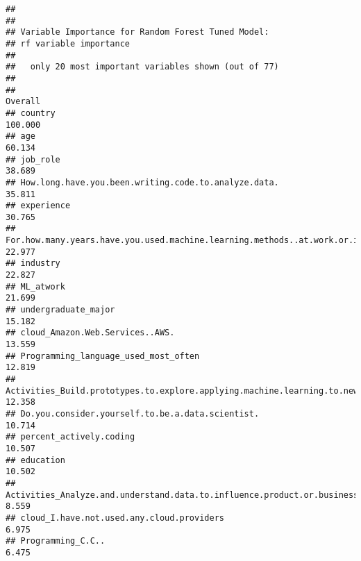 \documentclass[
]{article}
\begin{document}
\begin{verbatim}
## 
## 
## Variable Importance for Random Forest Tuned Model:
## rf variable importance
## 
##   only 20 most important variables shown (out of 77)
## 
##                                                                                                                             Overall
## country                                                                                                                     100.000
## age                                                                                                                          60.134
## job_role                                                                                                                     38.689
## How.long.have.you.been.writing.code.to.analyze.data.                                                                         35.811
## experience                                                                                                                   30.765
## For.how.many.years.have.you.used.machine.learning.methods..at.work.or.in.school..                                            22.977
## industry                                                                                                                     22.827
## ML_atwork                                                                                                                    21.699
## undergraduate_major                                                                                                          15.182
## cloud_Amazon.Web.Services..AWS.                                                                                              13.559
## Programming_language_used_most_often                                                                                         12.819
## Activities_Build.prototypes.to.explore.applying.machine.learning.to.new.areas                                                12.358
## Do.you.consider.yourself.to.be.a.data.scientist.                                                                             10.714
## percent_actively.coding                                                                                                      10.507
## education                                                                                                                    10.502
## Activities_Analyze.and.understand.data.to.influence.product.or.business.decisions                                             8.559
## cloud_I.have.not.used.any.cloud.providers                                                                                     6.975
## Programming_C.C..                                                                                                             6.475

\end{verbatim}
\end{document}
